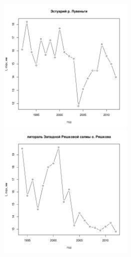 \documentclass[12pt, a4paper]{article}
\begin{document}
\begin{figure}[h]
\begin{minipage}[b]{.46\linewidth}
\begin{center}
\includegraphics[width=65mm]{../White_Sea/Estuatiy_Luvenga/L_max.pdf}
\end{center}
\end{minipage}
%
\hfil %
%
\begin{minipage}[b]{.46\linewidth}
\begin{center}
\includegraphics[width=65mm]{../White_Sea/Ryashkov_ZRS/L_max.pdf}
\end{center}
\end{minipage}



\end{figure}
\end{document}
